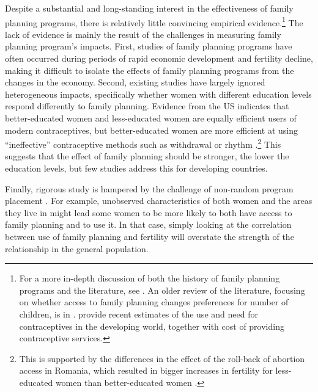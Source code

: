 Despite a substantial and long-standing interest in the effectiveness of family planning programs, there is relatively little convincing empirical evidence.\footnote{For a more in-depth discussion of both the history of family planning programs and the literature, see \citet{Miller2016}. An older review of the literature, focusing on whether access to family planning changes preferences for number of children, is in \citet{Freedman1997}. \citet{Singh2012} provide recent estimates of the use and need for contraceptives in the developing world, together with cost of providing contraceptive services.} The lack of evidence is mainly the result of the challenges in measuring family planning program's impacts. First, studies of family planning programs have often occurred during periods of rapid economic development and fertility decline, making it difficult to isolate the effects of family planning programs from the changes in the economy. Second, existing studies have largely ignored heterogeneous impacts, specifically whether women with different education levels respond differently to family planning. Evidence from the US indicates that better-educated women and less-educated women are equally efficient users of modern contraceptives, but better-educated women are more efficient at using ``ineffective'' contraceptive methods such as withdrawal or rhythm \citep{Rosenzweig1989}.\footnote{This is supported by the differences in the effect of the roll-back of abortion access in Romania, which resulted in bigger increases in fertility for less-educated women than better-educated women \citep{Pop-Eleches2010}.} This suggests that the effect of family planning should be stronger, the lower the education levels, but few studies address this for developing countries.

Finally, rigorous study is hampered by the challenge of non-random program placement \citep{rosenzweig86,pitt93,Miller2016}. For example, unobserved characteristics of both women and the areas they live in might lead some women to be more likely to both have access to family planning and to use it. In that case, simply looking at the correlation between use of family planning and fertility will overstate the strength of the relationship in the general population.

